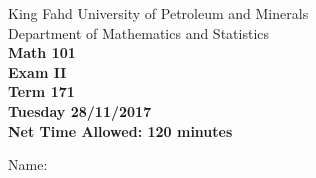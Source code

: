 \documentclass[amsfonts,bezier,leqno,fleqn,12pt,a4paper]{article}
\begin{document}
\newpage


\thispagestyle{empty}

\begin{center}
\begin{large}

King Fahd University of Petroleum and Minerals\\
Department of Mathematics and Statistics\\
\vspace*{0.5cm}
{\bf {}} \hfill {\bf Math 101} \hfill {\bf {}} \\
{\bf Exam II}  \\
{\bf Term 171}  \\
{\bf Tuesday 28/11/2017}  \\
{\bf Net Time Allowed: 120 minutes}  \\
\vspace*{0.2cm}

\end{large}
\end{center}

\large{Name:  }\hrulefill

\vspace{3mm}
\end{document}
